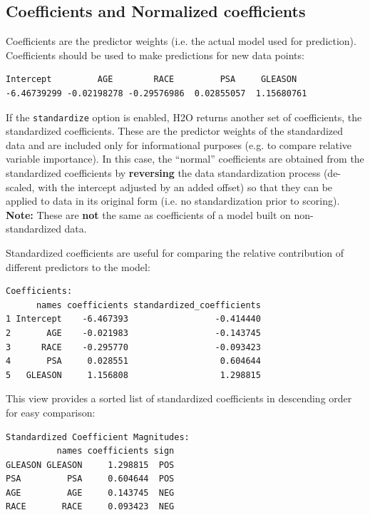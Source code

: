 \subsection{Coefficients and Normalized coefficients}

Coefficients are the predictor weights (i.e. the actual model used for prediction).  Coefficients should be used to
make predictions for new data points:


\begin{lstlisting}[style=output]
  Intercept         AGE        RACE         PSA     GLEASON 
-6.46739299 -0.02198278 -0.29576986  0.02855057  1.15680761 
\end{lstlisting}

If the \texttt{standardize} option is enabled, H2O returns another set of coefficients, the standardized
coefficients. These are the predictor weights of the standardized data and are included only for informational
purposes (e.g. to compare relative variable importance). In this case, the ``normal'' coefficients are obtained
from the standardized coefficients by \textbf{reversing} the data standardization process (de-scaled, with the
intercept adjusted by an added offset) so that they can be applied to data in its original form (i.e. no
standardization prior to scoring). \textbf{Note:} These are \textbf{not} the same as coefficients of a model built
on non-standardized data.

Standardized coefficients are useful for comparing the relative contribution of different predictors to the
model:


\begin{lstlisting}[style=output]
Coefficients:
      names coefficients standardized_coefficients
1 Intercept    -6.467393                 -0.414440
2       AGE    -0.021983                 -0.143745
3      RACE    -0.295770                 -0.093423
4       PSA     0.028551                  0.604644
5   GLEASON     1.156808                  1.298815
\end{lstlisting}

This view provides a sorted list of standardized coefficients in descending order for easy comparison:


\begin{lstlisting}[style=output]
Standardized Coefficient Magnitudes:
          names coefficients sign
GLEASON GLEASON     1.298815  POS
PSA         PSA     0.604644  POS
AGE         AGE     0.143745  NEG
RACE       RACE     0.093423  NEG
\end{lstlisting}

